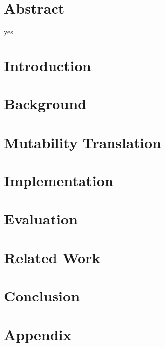 \frontmatter
\chapter*{Abstract}
yes


\tableofcontents

\mainmatter

\chapter{Introduction}


\chapter{Background}
\label{background}


\chapter{Mutability Translation}
\label{translation}


\chapter{Implementation}
\label{implementation}


\chapter{Evaluation}
\label{evaluation}


\chapter{Related Work}
\label{related-work}


\chapter{Conclusion}
\label{conclusion}



\appendix




\chapter{Appendix}

